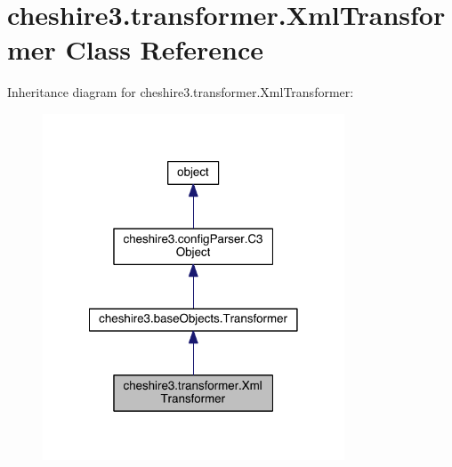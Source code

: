 \hypertarget{classcheshire3_1_1transformer_1_1_xml_transformer}{\section{cheshire3.\-transformer.\-Xml\-Transformer Class Reference}
\label{classcheshire3_1_1transformer_1_1_xml_transformer}
}


Inheritance diagram for cheshire3.\-transformer.\-Xml\-Transformer\-:
\nopagebreak
\begin{figure}[H]
\begin{center}
\leavevmode
\includegraphics[width=254pt]{classcheshire3_1_1transformer_1_1_xml_transformer__inherit__graph}
\end{center}
\end{figure}


